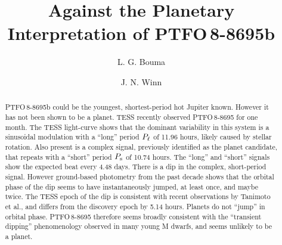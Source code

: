 \documentclass[12pt,twocolumn,tighten]{aastex62}
\begin{document}

\title{Against the Planetary Interpretation of PTFO$\,$8-8695b}


%
%
\author[0000-0002-0514-5538]{L. G. Bouma}
%
\author[0000-0002-4265-047X]{J. N. Winn}

%
%

\begin{abstract}
  PTFO$\,$8-8695b could be the youngest, shortest-period 
  hot Jupiter known.  However it has not been shown to be a planet.
  TESS recently observed PTFO$\,$8-8695 for one month.
  The TESS light-curve shows that the dominant variability in this
  system is a sinusoidal modulation with a ``long'' period $P_{\rm
  \ell}$
  of 11.96 hours, likely caused by stellar rotation.
  Also present is a complex signal, previously identified as the
  planet candidate, that repeats with a ``short'' period $P_{\rm s}$ of
  10.74 hours.
  The ``long'' and ``short'' signals show the expected beat every 4.48
  days.
  There is a dip in the complex, short-period signal.
  However ground-based photometry from the past decade shows that the
  orbital phase of the dip seems to have instantaneously jumped, at
  least once, and maybe twice.
  The TESS epoch of the dip is consistent with recent observations by
  Tanimoto et al., and differs from the discovery epoch by 5.14 hours.
  Planets do not ``jump'' in orbital phase.
  PTFO$\,$8-8695 therefore seems broadly consistent with the
  ``transient dipping'' phenomenology observed in many young M dwarfs,
  and seems unlikely to be a planet.
\end{abstract}
\end{document}
